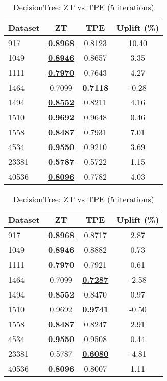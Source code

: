 \begin{table}[htbp]
\begin{center}
\begin{small}
\begin{sc}
\begin{subtable}[t]{0.48\textwidth}
    \centering
    \caption{DecisionTree: ZT vs TPE (1 iteration)}
    \label{tab:decisiontree-zt-vs-tpe-1}
    \begin{tabular}{lccc}
    \toprule
    \textbf{Dataset} & \textbf{ZT} & \textbf{TPE} & \textbf{Uplift (\%)} \\
    \midrule
    917    & \underline{\textbf{0.8968}} & 0.8123 & 10.40 \\
    1049    & \underline{\textbf{0.8946}} & 0.8657 & 3.35 \\
    1111    & \underline{\textbf{0.7970}} & 0.7643 & 4.27 \\
    1464    & 0.7099 & \textbf{0.7118} & -0.28 \\
    1494    & \underline{\textbf{0.8552}} & 0.8211 & 4.16 \\
    1510    & \textbf{0.9692} & 0.9648 & 0.46 \\
    1558    & \underline{\textbf{0.8487}} & 0.7931 & 7.01 \\
    4534    & \underline{\textbf{0.9550}} & 0.9210 & 3.69 \\
    23381    & \textbf{0.5787} & 0.5722 & 1.15 \\
    40536    & \underline{\textbf{0.8096}} & 0.7782 & 4.03 \\
    \bottomrule
    \end{tabular}
\end{subtable}
\hfill
\begin{subtable}[t]{0.48\textwidth}
    \centering
    \caption{DecisionTree: ZT vs TPE (5 iterations)}
    \label{tab:decisiontree-zt-vs-tpe-5}
    \begin{tabular}{lccc}
    \toprule
    \textbf{Dataset} & \textbf{ZT} & \textbf{TPE} & \textbf{Uplift (\%)} \\
    \midrule
    917    & \underline{\textbf{0.8968}} & 0.8717 & 2.87 \\
    1049    & \textbf{0.8946} & 0.8882 & 0.73 \\
    1111    & \textbf{0.7970} & 0.7921 & 0.61 \\
    1464    & 0.7099 & \underline{\textbf{0.7287}} & -2.58 \\
    1494    & \textbf{0.8552} & 0.8470 & 0.97 \\
    1510    & 0.9692 & \textbf{0.9741} & -0.50 \\
    1558    & \underline{\textbf{0.8487}} & 0.8247 & 2.91 \\
    4534    & \textbf{0.9550} & 0.9508 & 0.44 \\
    23381    & 0.5787 & \underline{\textbf{0.6080}} & -4.81 \\
    40536    & \textbf{0.8096} & 0.8007 & 1.11 \\
    \bottomrule
    \end{tabular}
\end{subtable}


\end{sc}
\end{small}
\end{center}
\end{table}
